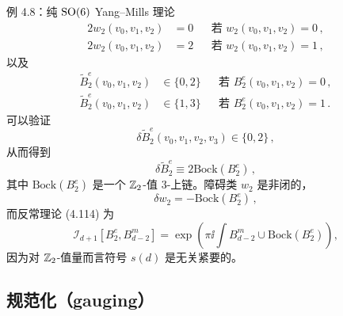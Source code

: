 \begin{examplebox}{例 4.8：纯 $\mathrm{SO}(6)$ Yang--Mills 理论}
\begin{equation}
\begin{aligned}
2w_2(v_0,v_1,v_2)&=0 &&\text{若 } w_2(v_0,v_1,v_2)=0\,,\\
2w_2(v_0,v_1,v_2)&=2 &&\text{若 } w_2(v_0,v_1,v_2)=1\,,
\end{aligned}
\tag{4.131}
\end{equation}
以及
\begin{equation}
\begin{aligned}
\tilde{B}_2^e(v_0,v_1,v_2)&\in\{0,2\} &&\text{若 } B_2^e(v_0,v_1,v_2)=0\,,\\
\tilde{B}_2^e(v_0,v_1,v_2)&\in\{1,3\} &&\text{若 } B_2^e(v_0,v_1,v_2)=1\,.
\end{aligned}
\tag{4.132}
\end{equation}
可以验证
\begin{equation}
\delta\tilde{B}_2^e(v_0,v_1,v_2,v_3)\in\{0,2\}\,,
\tag{4.133}
\end{equation}
从而得到
\begin{equation}
\delta\tilde{B}_2^e\equiv 2\mathrm{Bock}(B_2^e)\,,
\tag{4.134}
\end{equation}
其中 $\mathrm{Bock}(B_2^e)$ 是一个 $\mathbb{Z}_2$-值 3-上链。障碍类 $w_2$ 是非闭的，
\begin{equation}
\delta w_2=-\mathrm{Bock}(B_2^e)\,,
\tag{4.135}
\end{equation}
而反常理论 (4.114) 为
\begin{equation}
\mathcal{I}_{d+1}[B_2^e,B^m_{d-2}]=\exp\left(\pi\ii\int B^m_{d-2}\cup\mathrm{Bock}(B_2^e)\right),
\tag{4.136}
\end{equation}
因为对 $\mathbb{Z}_2$-值量而言符号 $s(d)$ 是无关紧要的。
\end{examplebox}



\subsection{规范化（gauging）}

